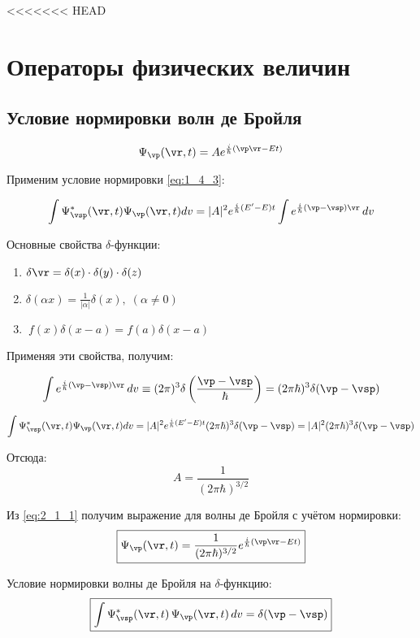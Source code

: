 <<<<<<< HEAD
\chapter{Операторы физических величин}

\section{Условие нормировки волн де Бройля}

\begin{equation}
\label{eq:2_1_1}
\Psi_{\vp}(\vr,t) = A e^{\frac{i}{\hbar}(\vp\vr-Et)}
\end{equation}

Применим условие нормировки \eqref{eq:1_4_3}:

$$\int \Psi^*_{\vsp}(\vr,t) \Psi_{\vp}(\vr,t) dv = |A|^2 e^{\frac{i}{\hbar}(E' - E)t} \int e^{\frac{i}{\hbar}(\vp - \vsp)\vr} \, dv$$

Основные свойства $\delta$-функции:
\begin{enumerate}
\item $ \delta {\vr} = \delta (x) \cdot \delta (y) \cdot \delta (z) $
\item $ \delta (\alpha x) = \frac{1}{|\alpha|} \delta (x), \; (\alpha \ne 0) $
\item $~ f(x) \delta (x - a) = f(a) \delta(x-a)$
\end{enumerate}

Применяя эти свойства, получим:

$$\int e^{\frac{i}{\hbar}(\vp - \vsp)\vr} \, dv \equiv (2 \pi )^3 \delta \left( \frac{\vp - \vsp}{\hbar} \right) = (2 \pi \hbar)^3 \delta (\vp - \vsp)$$

$$\int \Psi^*_{\vsp}(\vr,t) \Psi_{\vp}(\vr,t) dv = |A|^2 e^{\frac{i}{\hbar}(E' - E)t} (2 \pi \hbar)^3 \delta (\vp - \vsp) = |A|^2 (2 \pi \hbar)^3 \delta (\vp - \vsp)$$

Отсюда: $$A = \frac{1}{(2 \pi \hbar)^{3/2}}$$

Из \eqref{eq:2_1_1} получим выражение для волны де Бройля с учётом нормировки:
\begin{equation}
\label{eq:2_1_2}
\boxed{\Psi_{\vp}(\vr,t) = \frac{1}{(2 \pi \hbar)^{3/2}} e^{\frac{i}{\hbar} (\vp \vr - Et)}}
\end{equation}

Условие нормировки волны де Бройля на $\delta$-функцию:
\begin{equation}
\label{eq:2_1_3}
\boxed{\int\Psi^*_{\vsp}(\vr,t) \, \Psi_{\vp}(\vr,t) \, dv = \delta (\vp - \vsp)}
\end{equation}

